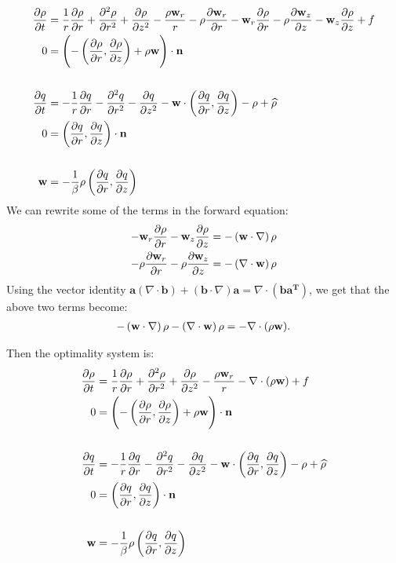 \begin{align*}
	\frac{\partial \rho}{\partial t} &= \frac{1}{r} \frac{\partial \rho}{\partial r} +  \frac{\partial^2 \rho}{\partial r^2} + \frac{\partial \rho}{\partial z^2} - \frac{\rho\mathbf{w}_r}{r} -\rho\frac{\partial \mathbf{w}_r }{\partial r} -\mathbf{w}_r\frac{\partial \rho}{\partial r} - \rho\frac{\partial \mathbf{w}_z}{\partial z}- \mathbf{w}_z\frac{\partial \rho}{\partial z} + f\\
	0 &= \left(- \left(\frac{\partial \rho}{\partial r},  \frac{\partial \rho}{\partial z}\right) + \rho \mathbf{w} \right) \cdot \mathbf{n} \\
	\\
	\frac{\partial q}{\partial t} &= - \frac{1}{r} \frac{\partial q}{\partial r} -  \frac{\partial^2 q}{\partial r^2} - \frac{\partial q}{\partial z^2} - \mathbf{w} \cdot \left(\frac{\partial q}{\partial r},  \frac{\partial q}{\partial z}\right) - \rho + \widehat \rho\\
	0 &= \left(\frac{\partial q}{\partial r},  \frac{\partial q}{\partial z}\right) \cdot \mathbf{n} \\
	\\
	\mathbf{w} &= - \frac{1}{\beta}\rho  \left(\frac{\partial q}{\partial r},  \frac{\partial q}{\partial z}\right)
\end{align*}
We can rewrite some of the terms in the forward equation:
\begin{align*}
	-\mathbf{w}_r\frac{\partial \rho}{\partial r} - \mathbf{w}_z\frac{\partial \rho}{\partial z} &= - \left(\mathbf{w} \cdot \nabla \right)\rho\\
	-\rho\frac{\partial \mathbf{w}_r }{\partial r} - \rho\frac{\partial \mathbf{w}_z}{\partial z} &= -\left(\nabla \cdot \mathbf{w} \right)\rho 
\end{align*}
Using the vector identity $\mathbf a (\nabla \cdot \mathbf b) + (\mathbf b \cdot \nabla ) \mathbf a = \nabla \cdot (\mathbf{b a^T})$, we get that the above two terms become:
\begin{align*}
	- \left(\mathbf{w} \cdot \nabla \right)\rho - \left(\nabla \cdot \mathbf{w} \right)\rho = - \nabla \cdot (\rho\mathbf{w} ).
\end{align*}

Then the optimality system is:
\begin{align*}
	\frac{\partial \rho}{\partial t} &= \frac{1}{r} \frac{\partial \rho}{\partial r} +  \frac{\partial^2 \rho}{\partial r^2} + \frac{\partial \rho}{\partial z^2} - \frac{\rho\mathbf{w}_r}{r} - \nabla \cdot (\rho \mathbf{w} ) + f\\
	0 &= \left(- \left(\frac{\partial \rho}{\partial r},  \frac{\partial \rho}{\partial z}\right) + \rho \mathbf{w} \right) \cdot \mathbf{n} \\
	\\
	\frac{\partial q}{\partial t} &= - \frac{1}{r} \frac{\partial q}{\partial r} -  \frac{\partial^2 q}{\partial r^2} - \frac{\partial q}{\partial z^2} - \mathbf{w} \cdot \left(\frac{\partial q}{\partial r},  \frac{\partial q}{\partial z}\right) - \rho + \widehat \rho\\
	0 &= \left(\frac{\partial q}{\partial r},  \frac{\partial q}{\partial z}\right) \cdot \mathbf{n} \\
	\\
	\mathbf{w} &= - \frac{1}{\beta}\rho  \left(\frac{\partial q}{\partial r},  \frac{\partial q}{\partial z}\right)
\end{align*}


